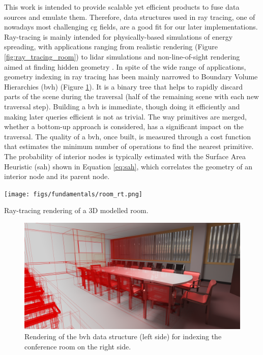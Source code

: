 This work is intended to provide scalable yet efficient products to fuse data sources and emulate them. Therefore, data structures used in ray tracing, one of nowadays most challenging \acrshort{cg} fields, are a good fit for our later implementations. Ray-tracing is mainly intended for physically-based simulations of energy spreading, with applications ranging from realistic rendering (Figure \ref{fig:ray_tracing_room}) to \acrshort{lidar} simulations and non-line-of-sight rendering aimed at finding hidden geometry \cite{royo_non-line--sight_2022}. In spite of the wide range of applications, geometry indexing in ray tracing has been mainly narrowed to Boundary Volume Hierarchies (\acrshort{bvh}) \cite{meister_survey_2021} (Figure \ref{fig:bvh_raytracing}). It is a binary tree that helps to rapidly discard parts of the scene during the traversal (half of the remaining scene with each new traversal step). Building a \acrshort{bvh} is immediate, though doing it efficiently and making later queries efficient is not as trivial. The way primitives are merged, whether a bottom-up approach is considered, has a significant impact on the traversal. The quality of a \acrshort{bvh}, once built, is measured through a cost function that estimates the minimum number of operations to find the nearest primitive. The probability of interior nodes is typically estimated with the Surface Area Heuristic (\acrshort{sah}) shown in Equation \ref{eq:sah}, which correlates the geometry of an interior node and its parent node. 
\begin{marginfigure}[-5.0cm]
    \texttt{[image: figs/fundamentals/room\_rt.png]}
	\caption{Ray-tracing rendering of a 3D modelled room. }
    \label{fig:ray_tracing_room}
\end{marginfigure}

\begin{figure}[ht]
	\includegraphics[width=\textwidth]{figs/fundamentals/bvh_raytracing.png}
	\caption{Rendering of the \acrshort{bvh} data structure (left side) for indexing the conference room \cite{mcguire_computer_2017} on the right side. }
    \label{fig:bvh_raytracing}
\end{figure}

